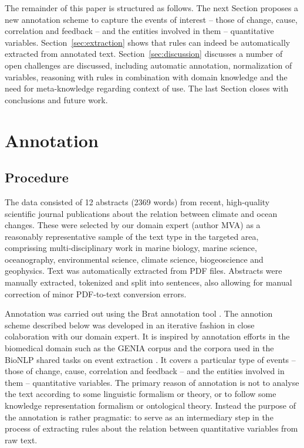 \documentclass[10pt, a4paper]{article}
\begin{document}

The remainder of this paper is structured as follows. 
The next Section proposes a new annotation scheme to capture the events of interest -- those of change, cause, correlation and feedback -- and the entities involved in them -- quantitative variables. 
Section~\ref{sec:extraction} shows that  rules can indeed be automatically extracted from annotated text.
Section~\ref{sec:discussion} discusses a number of open challenges are discussed, including automatic annotation, normalization of variables, reasoning with rules in combination with domain knowledge and the need for meta-knowledge regarding context of use.
The last Section closes with conclusions and future work.

\section{Annotation}

\subsection{Procedure}

The data consisted of 12 abstracts (2369 words) from recent, high-quality scientific journal publications about the relation between climate and ocean changes. 
These were selected by our domain expert (author MVA) as a reasonably representative sample of the text type in the targeted area, comprissing multi-disciplinary work in marine biology, marine science, oceanography, environmental science, climate science, biogeoscience and geophysics.
Text was automatically extracted from PDF files.
Abstracts were manually extracted, tokenized and split into sentences, also allowing for manual correction of minor PDF-to-text conversion errors.

Annotation was carried out using the Brat annotation tool \cite{stenetorp2012}.
The annotion scheme described below was developed in an iterative fashion in close colaboration with our domain expert.
It is inspired by annotation efforts in the biomedical domain such as the GENIA corpus \cite{Kim2003GENIA} and the corpora used in the BioNLP shared tasks on event extraction \cite{Kim2009Overview}.
It covers a particular type of events -- those of change, cause, correlation and feedback -- and the entities involved in them -- quantitative variables.
The primary reason of annotation is not to analyse the text according to some linguistic formalism or theory, or to follow some knowledge representation formalism or ontological theory.
Instead the purpose of the annotation is rather pragmatic: to serve as an intermediary step in the process of extracting rules about the relation between quantitative variables from raw text.      
 
\end{document}
